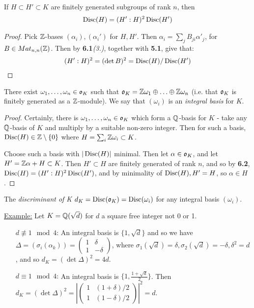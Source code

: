 \documentclass[10pt,a4paper]{article}
\begin{document}
\begin{lemma} If $H \subset H' \subset K$ are finitely generated subgroups of rank $n$, then
\begin{align*}
\operatorname{Disc}(H) = (H':H)^2\operatorname{Disc}(H')
\end{align*}
\end{lemma}
\begin{proof}
Pick $\mathbb{Z}$-bases $(\alpha_i), (\alpha_i')$ for $H, H'$. Then $\alpha_i = \sum_j B_{ji} \alpha'_j$, for $B \in Mat_{n,n}(\mathbb{Z})$. Then by \textbf{6.1}\textit{(3.)}, together with \textbf{5.1}, give that:
\begin{align*}
(H':H)^2 = (\det B)^2 = \operatorname{Disc}(H)/\operatorname{Disc}(H')
\end{align*}
\end{proof}

\begin{theorem}
There exist $\omega_1, \ldots, \omega_n \in \mathfrak{o}_K$ such that $\mathfrak{o}_K = \mathbb{Z}\omega_1\oplus\ldots\oplus\mathbb{Z}\omega_n$ (i.e. that $\mathfrak{o}_K$ is finitely generated as a $\mathbb{Z}$-module). We say that $(\omega_i)$ is an \emph{integral basis} for $K$.
\end{theorem}
\begin{proof}
Certainly, there is $\omega_1, \ldots, \omega_n \in \mathfrak{o}_K$ which form a $\mathbb{Q}$-basis for $K$ - take any $\mathbb{Q}$-basis of $K$ and multiply by a suitable non-zero integer. Then for such a basis, $\operatorname{Disc}(H) \in \mathbb{Z}\setminus\{0\}$ where $H = \sum_i \mathbb{Z}\omega_i \subset K$.

Choose such a basis with $|\operatorname{Disc}(H)|$ minimal. Then let $\alpha \in \mathfrak{o}_K$, and let $H' = \mathbb{Z}\alpha + H \subset K$. Then $H' \subset H$ are finitely generated of rank $n$, and so by \textbf{6.2}, $\operatorname{Disc}(H) = (H':H)^2\operatorname{Disc}(H')$, and by minimality of $\operatorname{Disc}(H), H' = H$, so $\alpha \in H$.
\end{proof}

The \emph{discriminant of K} $d_K = \operatorname{Disc}(\mathfrak{o}_K) = \operatorname{Disc}(\omega_i)$ for any integral basis $(\omega_i)$.

\hspace*{-1em}\underline{Example:} Let $K = \mathbb{Q}(\sqrt{d})$ for $d$ a square free integer not 0 or 1.
\begin{itemize}
\item[$d \nequiv 1 \mod 4$:] An integral basis is $\{1, \sqrt{d}\}$ and so we have $\Delta = (\sigma_i(\alpha_k)) = \begin{pmatrix} 1 & \delta \\ 1 & -\delta\end{pmatrix}$, where $\sigma_1(\sqrt{d}) = \delta, \sigma_2(\sqrt{d}) = -\delta, \delta^2 = d$, and so $d_K = (\det \Delta)^2 = 4d$.

\item[$d \equiv 1 \mod 4$:] An integral basis is $\{1, \frac{1+\sqrt{d}}{2}\}$. Then $d_K = (\det \Delta)^2 = \left|\begin{pmatrix} 1 & (1+\delta)/2 \\ 1 & (1-\delta)/2 \end{pmatrix}\right|^2 = d$.
\end{itemize}
\end{document}
